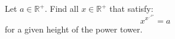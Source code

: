 Let $a \in \mathbb{R}^{+}$.
Find all $x \in \mathbb{R}^{+}$ that satisfy:
\begin{equation*}
  x^{x^{{\iddots}^{x^a}}} = a
\end{equation*}
for a given height of the power tower.
